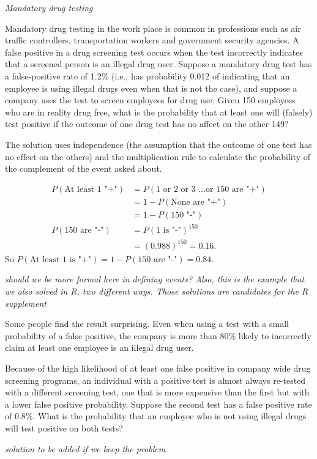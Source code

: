 \begin{example} \textit{Mandatory drug testing}

Mandatory drug testing in the work place is common in professions such as air traffic controllers, transportation workers and government security agencies.  A false positive in a drug screening test occurs when the test incorrectly indicates that a screened person is an illegal drug user.  Suppose a mandatory drug test has a false-positive rate of 1.2\% (i.e., has probability  0.012 of indicating that an employee is using illegal drugs even when that is not the case), and suppose a company uses the test to screen employees for drug use.  Given 150 employees who are in reality drug free, what is the probability that at least one will (falsely) test positive if the outcome of one drug test has no affect on the other 149?  
   
The solution uses independence (the assumption that the outcome of one test has no effect on the others) and the multiplication rule to calculate the probability of the complement of the event asked about.

   \begin{align*} 
   P(\text{At least 1 "+"}) &= P(\text{1 or 2 or 3 \ldots or 150 are "+"}) \\
           &= 1 - P(\text{None are "+"}) \\
           &= 1 - P(\text{150 "-"}) \\
 P(\text{150 are "-"}) &= P(\text{1 is "-"})^{150} \\
           &= (0.988)^{150} = 0.16.
    \end{align*}
   So $P(\text{At least 1 is "+"})  = 1 - P(\text{150 are "-"}) = 0.84.$
 
   \textit{should we be more formal here in defining events? Also, this is the example that we also solved in R, two different ways.  Those solutions are candidates for the R supplement}

Some people find the result surprising.  Even when using a test with a small probability of a false positive, the company is more than 80\% likely to incorrectly claim at least one employee is an illegal drug user.

\end{example}

\begin{exercise}
Because of the high likelihood of at least one false positive in company wide drug screening programs, an individual with a positive test is almost always re-tested with a different screening test, one that is more expensive than the first but with a lower false positive probability.  Suppose the second test has a false positive rate of 0.8\%.  What is the probability that an employee who is not using illegal drugs will test positive on both tests?

\textit{solution to be added if we keep the problem}

\end{exercise}

